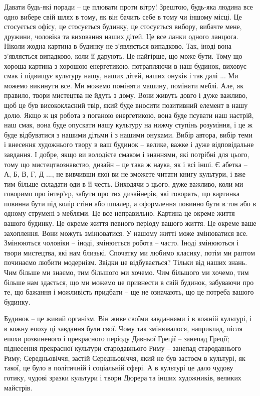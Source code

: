 Давати будь-які поради – це плювати проти вітру! Зрештою, будь-яка людина все
одно вибере свій шлях в тому, як він бачить себе в тому чи іншому місці. Це
стосується офісу, це стосується будинку, це стосується вибору, вибачте мене,
дружини, чоловіка та виховання наших дітей. Це все ланки одного ланцюга. Ніколи
жодна картина в будинку не з'являється випадково. Так, іноді вона з'являється
випадково, коли її дарують. Це найгірше, що може бути. Тому що хороша картина з
хорошою енергетикою, потрапляючи в наш будинок, виховує смак і підвищує
культуру нашу, наших дітей, наших онуків і так далі ... Ми можемо викинути все.
Ми можемо поміняти машину, поміняти меблі. Але, як правило, твори мистецтва не
йдуть з дому. Вони живуть довго і дуже важливо, щоб це був висококласний твір,
який буде вносити позитивний елемент в нашу долю. Якщо ж ця робота з поганою
енергетикою, вона буде псувати наш настрій, наш смак, вона буде опускати нашу
культуру на нижчу ступінь розуміння, і це ж буде відбуватися з нашими дітьми і
з нашими онуками. Вибір автора, вибір теми і внесення художнього твору в ваш
будинок – велике, важке і дуже відповідальне завдання. І добре, якщо ви
володієте смаком і знаннями, які потрібні для цього, тому що мистецтвознавство,
дизайн – це така ж наука, як і всі інші. Є абетка – А, Б, В, Г, Д ..., не
вивчивши якої ви не зможете читати книгу культури, і вже тим більше складати
оди в її честь. Виходячи з цього, дуже важливо, коли ми говоримо про інтер'єр,
забути про тих дизайнерів, які говорять, що картинка повинна бути під колір
стіни або шпалер, а оформлення повинно бути в тон або в одному струмені з
меблями. Це все неправильно. Картина це окреме життя вашого будинку. Це окреме
життя певного періоду вашого життя. Це окреме ваше захоплення. Вони можуть
змінюватися. У нашому житті може змінюватися все. Змінюються чоловіки – іноді,
змінюється робота – часто. Іноді змінюються і твори мистецтва, які нам близькі.
Спочатку ми любимо класику, потім ми раптом починаємо любити модернізм. Звідки
це відбувається? Тільки від наших знань. Чим більше ми знаємо, тим більшого ми
хочемо. Чим більшого ми хочемо, тим більше нам здається, що ми можемо це
привнести в свій будинок, забуваючи про те, що бажання і можливість придбати –
ще не означають, що це потреба вашого будинку.

Будинок – це живий організм. Він живе своїми завданнями і в кожній культурі, і
в кожну епоху ці завдання були свої. Чому так змінювалося, наприклад, після
епохи розвиненого і прекрасного періоду Давньої Греції – занепад Греції;
піднесення прекрасної культури стародавнього Риму – занепад стародавнього Риму;
Середньовіччя, застій Середньовіччя, який не був застоєм в культурі, як такої,
це було в політичній і соціальній сфері. А в культурі це дало чудову готику,
чудові зразки культури і твори Дюрера та інших художників, великих майстрів.

